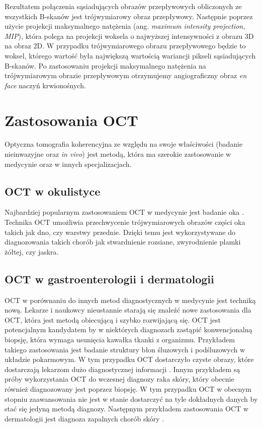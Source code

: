 Rezultatem połączenia sąsiadujących obrazów przepływowych obliczonych ze wszystkich B-skanów jest trójwymiarowy obraz przepływowy. Następnie poprzez użycie projekcji maksymalnego natężenia (ang. \textit{maximum intensity projection, MIP}), która polega na projekcji woksela o najwyższej intensywności z obrazu 3D na obraz 2D. W przypadku trójwymiarowego obrazu przepływowego będzie to woksel, którego wartość była największą wartością wariancji pikseli sąsiadujących B-skanów. Po zastosowaniu projekcji maksymalnego natężenia na trójwymiarowym obrazie przepływowym otrzymujemy angiograficzny obraz \textit{en face} naczyń krwionośnych.


\section{Zastosowania OCT}
\label{sec:obrazowanie_oct:zastosowania_oct}

Optyczna tomografia koherencyjna ze względu na swoje właściwości (badanie nieinwazyjne oraz \textit{in vivo}) jest metodą, która ma szerokie zastosowanie w medycynie oraz w innych specjalizacjach.

\subsection{OCT w okulistyce}

Najbardziej popularnym zastosowaniem OCT w medycynie jest badanie oka \cite{Fercher03}. Technika OCT umożliwia przechwycenie trójwymiarowych obrazów części oka takich jak dno, czy warstwy przednie. Dzięki temu jest wykorzystywane do diagnozowania takich chorób jak stwardnienie rozsiane, zwyrodnienie plamki żółtej, czy jaskra.

\subsection{OCT w gastroenterologii i dermatologii}

OCT w porównaniu do innych metod diagnostycznych w medycynie jest techniką nową. Lekarze i naukowcy nieustannie starają się znaleźć nowe zastosowania dla OCT, która jest metodą obiecującą i szybko rozwijającą się. OCT jest potencjalnym kandydatem by w niektórych diagnozach zastąpić konwencjonalną biopsję, która wymaga usunięcia kawałka tkanki z organizmu. Przykładem takiego zastosowania jest badanie struktury błon śluzowych i podśluzowych w układzie pokarmowym. W tym przypadku OCT dostarczyło czyste obrazy, które dostarczają lekarzom dużo diagnostycznej informacji \cite{Rollins:99}. Innym przykładem są próby wykorzystania OCT do wczesnej diagnozy raka skóry, który obecnie również diagnozowany jest poprzez biopsję. W tym przypadku OCT w obecnym stopniu zaawansowania nie jest w stanie dostarczyć na tyle dokładnych danych by stać się jedyną metodą diagnozy. Następnym przykładem zastosowania OCT w dermatologii jest diagnoza zapalnych chorób skóry \cite{Welzel01}.


